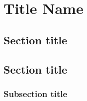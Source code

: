 \chapter{Title Name}
\label{chapter1}

\ifpdf
    \graphicspath{{Chapter1/Figs/Raster/}{Chapter1/Figs/PDF/}{Chapter1/Figs/}}
\else
    \graphicspath{{Chapter1/Figs/Vector/}{Chapter1/Figs/}}
\fi

\section{Section title}
\label{motivation}
\lipsum[2-3]

\section{Section title}
\lipsum[5-8]

\subsection{Subsection title}
\lipsum[6-7]



